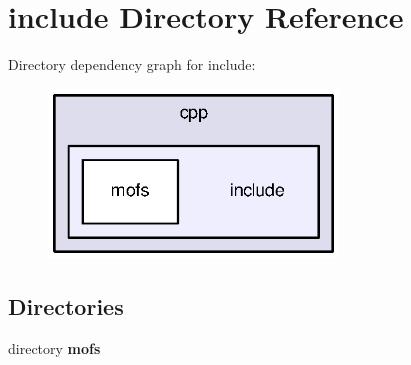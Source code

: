 \section{include Directory Reference}
\label{dir_5c746db28f269a6c533584ec53c3b8ce}
Directory dependency graph for include\-:\nopagebreak
\begin{figure}[H]
\begin{center}
\leavevmode
\includegraphics[width=218pt]{dir_5c746db28f269a6c533584ec53c3b8ce_dep}
\end{center}
\end{figure}
\subsection*{Directories}
\begin{DoxyCompactItemize}
\item 
directory {\bf mofs}
\end{DoxyCompactItemize}
